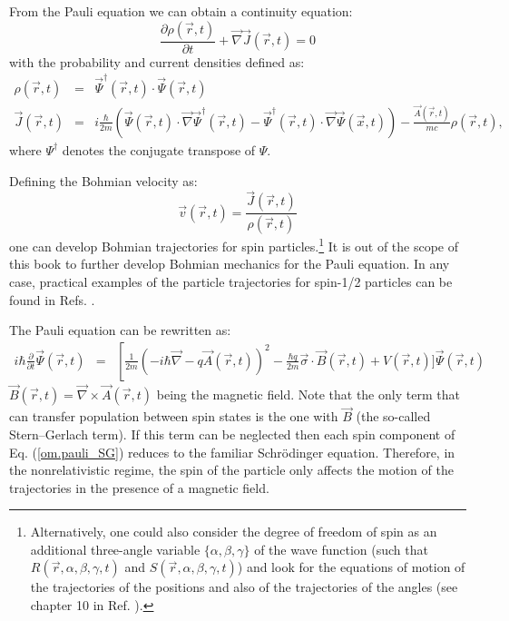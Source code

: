 \documentclass[onecolumn,nofootinbib, secnumarabic, amsmath, nobibnotes,11pt,aps,pra]{revtex4-1}
\newcommand{\eref}[1]{Eq. (\ref{#1})}
\begin{document}
From the Pauli equation we can obtain a continuity equation:
\begin{equation}
\label{om.difcurrent_density_pauli}
\frac{\partial\rho(\vec{r},t)}{\partial t} + \vec{\nabla} \vec{J}(\vec{r},t) = 0
\end{equation}
with the probability and current densities defined as:
\begin{eqnarray}
\label{om.rhospin}
\rho(\vec r,t) & = & \vec \Psi^{\dagger}(\vec{r},t)\cdot\vec \Psi(\vec{r},t) \\
\label{om.currentspin}
\vec J(\vec{r},t) & = & i \frac {\hbar} {2 m}
\left(\vec\Psi(\vec{r},t)\cdot {\vec{\nabla} \vec
\Psi^{\dagger}(\vec{r},t)} - \vec\Psi^{\dagger}(\vec{r},t) \cdot
{\vec{\nabla} \vec \Psi(\vec{x},t)} \right)-\frac {\vec A(\vec r,t)} {mc} \rho(\vec r,t),
\end{eqnarray}
where $\Psi^{\dagger}$ denotes the conjugate transpose of $\Psi$.

Defining the Bohmian velocity as:
\begin{equation}
\vec v(\vec r,t) = \frac{ \vec{J}(\vec{r},t)}{\rho(\vec r,t)}
\end{equation}
one can develop Bohmian trajectories for spin particles.\footnote{Alternatively, one could also consider the degree of freedom of spin as an additional three-angle variable $\{\alpha,\beta,\gamma\}$ of the wave function (such that $R(\vec r,\alpha,\beta,\gamma,t)$ and $S(\vec r,\alpha,\beta,\gamma,t)$) and look for the equations of motion of the trajectories of the positions and also of the trajectories of the angles (see chapter 10 in Ref. \cite{om.Holand1993}).} It is out of the scope of this book to further develop Bohmian mechanics for the Pauli equation.
In any case, practical examples of the particle trajectories for spin-1/2 particles can be found in Refs. \cite{om.Holland2003,om.colijn2002}.

The Pauli equation can be rewritten as:
\begin{eqnarray}
\label{om.pauli_SG}
i \hbar \frac{ \partial}{\partial t} \vec \Psi(\vec r,t) &=&
\left[ \frac{1}{2m} \left(- i \hbar \vec{\nabla} - q \vec{A}(\vec r,t)\right) ^2 -\frac{\hbar q}{2m} \vec{\sigma}\cdot\vec{B}(\vec r,t)\right.+ V(\vec r,t) \bigg]\vec \Psi(\vec r,t)
\end{eqnarray}
$\vec{B}(\vec r,t) = \vec{\nabla} \times \vec{A}(\vec r,t)$ being
the magnetic field. Note that the only term that can transfer
population between spin states is the one with $\vec{B}$ (the
so-called Stern--Gerlach term). If this term can be neglected then
each spin component of \eref{om.pauli_SG} reduces to the familiar
Schr\"odinger equation. Therefore, in the nonrelativistic regime,
the spin of the particle only affects the motion of the trajectories
in the presence of a magnetic field.
\end{document}
